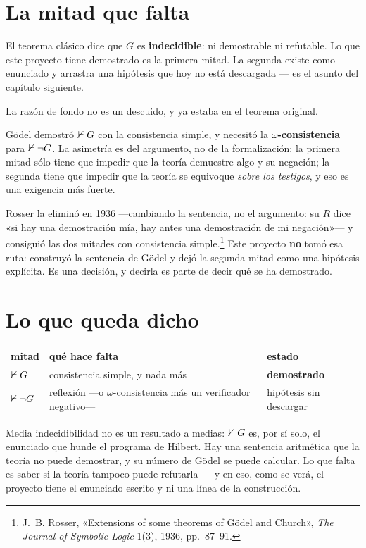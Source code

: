\section{La mitad que falta}

\avisomediagodel

El teorema clásico dice que $G$ es \textbf{indecidible}: ni demostrable ni refutable. Lo que este
proyecto tiene demostrado es la primera mitad. La segunda existe como enunciado y arrastra una
hipótesis que hoy no está descargada — es el asunto del capítulo siguiente.

La razón de fondo no es un descuido, y ya estaba en el teorema original.

\begin{leccion}
Gödel demostró $\nvdash G$ con la consistencia simple, y necesitó la
\textbf{$\omega$-consistencia} para $\nvdash \lnot G$. La asimetría es del argumento, no de la
formalización: la primera mitad sólo tiene que impedir que la teoría demuestre algo y su negación;
la segunda tiene que impedir que la teoría se equivoque \emph{sobre los testigos}, y eso es una
exigencia más fuerte.

Rosser la eliminó en 1936 —cambiando la sentencia, no el argumento: su $R$ dice «si hay una
demostración mía, hay antes una demostración de mi negación»— y consiguió las dos mitades con
consistencia simple.\footnote{J.~B. Rosser, «Extensions of some theorems of Gödel and Church»,
\emph{The Journal of Symbolic Logic} 1(3), 1936, pp.~87--91.} Este proyecto \textbf{no} tomó esa
ruta: construyó la sentencia de Gödel y dejó la segunda mitad como una hipótesis explícita. Es una
decisión, y decirla es parte de decir qué se ha demostrado.
\end{leccion}

\section{Lo que queda dicho}

\begin{center}\small
\begin{tabularx}{\linewidth}{@{}l >{\raggedright\arraybackslash}X l@{}}
\toprule
mitad & qué hace falta & estado \\
\midrule
$\nvdash G$ & consistencia simple, y nada más & \textbf{demostrado} \\
$\nvdash \lnot G$ & reflexión —o $\omega$-consistencia más un verificador negativo— & hipótesis sin descargar \\
\bottomrule
\end{tabularx}
\end{center}

Media indecidibilidad no es un resultado a medias: $\nvdash G$ es, por sí solo, el enunciado que
hunde el programa de Hilbert. Hay una sentencia aritmética que la teoría no puede demostrar, y su
número de Gödel se puede calcular. Lo que falta es saber si la teoría tampoco puede refutarla — y
en eso, como se verá, el proyecto tiene el enunciado escrito y ni una línea de la construcción.
